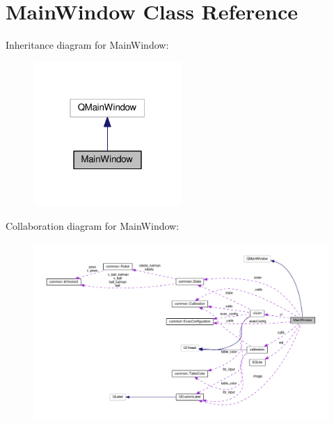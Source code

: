 \hypertarget{classMainWindow}{}\section{Main\+Window Class Reference}
\label{classMainWindow}


Inheritance diagram for Main\+Window\+:\nopagebreak
\begin{figure}[H]
\begin{center}
\leavevmode
\includegraphics[width=160pt]{classMainWindow__inherit__graph}
\end{center}
\end{figure}


Collaboration diagram for Main\+Window\+:\nopagebreak
\begin{figure}[H]
\begin{center}
\leavevmode
\includegraphics[width=350pt]{classMainWindow__coll__graph}
\end{center}
\end{figure}
